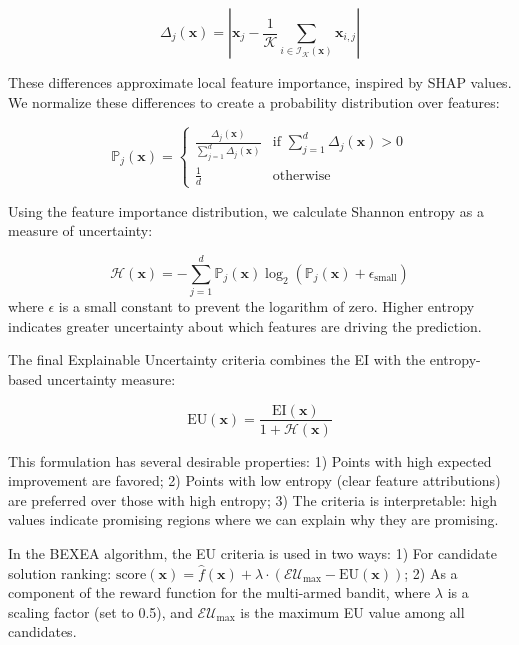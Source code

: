\documentclass[review]{elsarticle}
\begin{document}
\begin{equation}
\Delta_j(\boldsymbol{x}) = \left| \boldsymbol{x}_j - \frac{1}{\mathcal{K}} \sum_{i \in \mathcal{I}_\mathcal{K}(\boldsymbol{x})} \boldsymbol{x}_{i,j} \right|
\end{equation}

These differences approximate local feature importance, inspired by SHAP values. We normalize these differences to create a probability distribution over features:

\begin{equation}
\mathbb{P}_j(\boldsymbol{x}) = 
\begin{cases}
\frac{\Delta_j(\boldsymbol{x})}{\sum_{j=1}^d \Delta_{j}(\boldsymbol{x})} & \text{if } \sum_{j=1}^d \Delta_{j}(\boldsymbol{x}) > 0 \\
\frac{1}{d} & \text{otherwise}
\end{cases}
\end{equation}

Using the feature importance distribution, we calculate Shannon entropy as a measure of uncertainty:

\begin{equation}
\mathcal{H}(\boldsymbol{x}) = -\sum_{j=1}^d \mathbb{P}_j(\boldsymbol{x}) \log_2(\mathbb{P}_j(\boldsymbol{x}) + \epsilon_\text{small})
\end{equation}
where $\epsilon$ is a small constant to prevent the logarithm of zero. Higher entropy indicates greater uncertainty about which features are driving the prediction.

The final Explainable Uncertainty criteria combines the EI with the entropy-based uncertainty measure:

\begin{equation}
\text{EU}(\boldsymbol{x}) = \frac{\text{EI}(\boldsymbol{x})}{1 + \mathcal{H}(\boldsymbol{x})}
\end{equation}

This formulation has several desirable properties: 1) Points with high expected improvement are favored; 2) Points with low entropy (clear feature attributions) are preferred over those with high entropy; 3) The criteria is interpretable: high values indicate promising regions where we can explain why they are promising.

In the BEXEA algorithm, the EU criteria is used in two ways: 1) For candidate solution ranking: $\text{score}(\boldsymbol{x}) = \hat{f}(\boldsymbol{x}) + \lambda \cdot (\mathcal{EU}_{\text{max}} - \text{EU}(\boldsymbol{x}))$; 2) As a component of the reward function for the multi-armed bandit, where $\lambda$ is a scaling factor (set to 0.5), and $\mathcal{EU}_{\text{max}}$ is the maximum EU value among all candidates.
\end{document}
